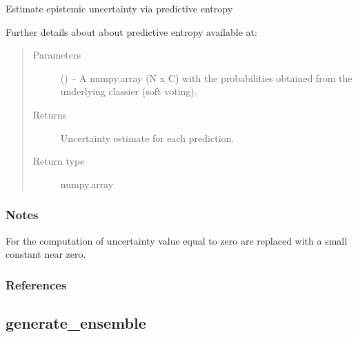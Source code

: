 \documentclass[letterpaper,10pt,english]{sphinxmanual}
\begin{document}
\begin{fulllineitems}
\label{\detokenize{api/ucf.compute_predictive_entropy:ucf.compute_predictive_entropy}}
Estimate epistemic uncertainty via predictive entropy %
\begin{footnote}[1]\sphinxAtStartFootnote
Further details about about predictive entropy available at:
%
\end{footnote}
\begin{quote}\begin{description}
\item[{Parameters}] \leavevmode
{} () -- A numpy.array (N x C) with the probabilities obtained from the
underlying classier (soft voting).

\item[{Returns}] \leavevmode
Uncertainty estimate for each prediction.

\item[{Return type}] \leavevmode
numpy.array

\end{description}\end{quote}
\subsubsection*{Notes}

For the computation of uncertainty value equal to zero are
replaced with a small constant near zero.
\subsubsection*{References}

\end{fulllineitems}



\subsection{generate\_ensemble}
\label{\detokenize{api/ucf.generate_ensemble:generate-ensemble}}\label{\detokenize{api/ucf.generate_ensemble::doc}}
\end{document}
